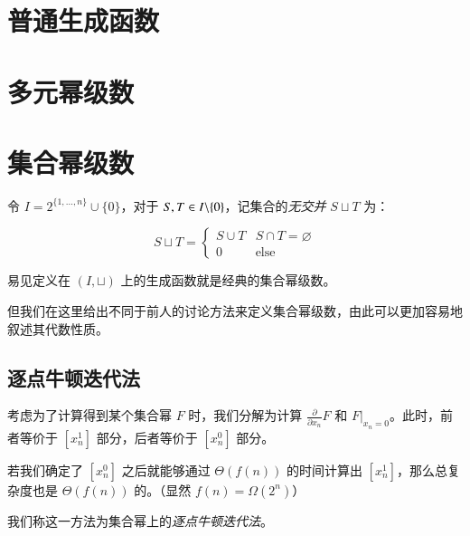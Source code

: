 \begin{definition} [在线算法]

\end{definition}

\section{普通生成函数}



\section{多元幂级数}

\section{集合幂级数}

\begin{definition}[集合幂级数的集合定义]
令 $I=2^{\{1,\dots,n\}}\cup\{0\}$，对于 $S,T\in {I \backslash \{0\}}$，记集合的\emph{无交并} $S\sqcup T$ 为：

$$
S\sqcup T = \begin{cases}
S \cup T & S\cap T = \varnothing\\
0 & \mathrm{else}
\end{cases}
$$

易见定义在 $(I,\sqcup)$ 上的生成函数就是经典的集合幂级数。
\end{definition}

但我们在这里给出不同于前人的讨论方法来定义集合幂级数，由此可以更加容易地叙述其代数性质。



\subsection{逐点牛顿迭代法}

考虑为了计算得到某个集合幂 $F$ 时，我们分解为计算 $\frac{\partial}{\partial x_n} F$ 和 $\left . F \right |_{x_n=0}$。此时，前者等价于 $[x_n^1]$ 部分，后者等价于 $[x_n^0]$ 部分。

若我们确定了 $[x_n^0]$ 之后就能够通过 $\Theta(f(n))$ 的时间计算出 $[x_n^1]$，那么总复杂度也是 $\Theta(f(n))$ 的。（显然 $f(n) = \Omega(2^n)$）

我们称这一方法为集合幂上的\emph{逐点牛顿迭代法}。

\begin{problem}

\end{problem}

